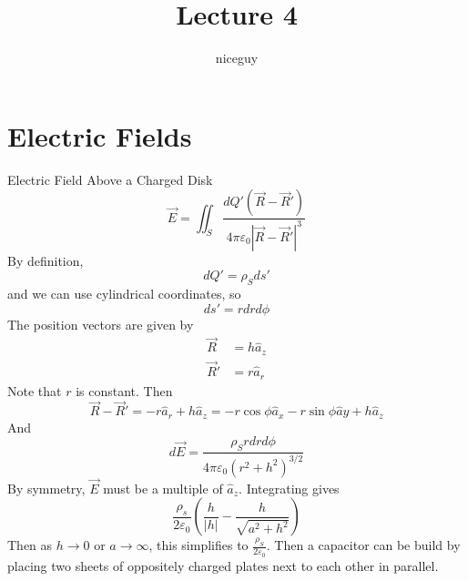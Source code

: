 \documentclass[12pt]{article}
\author{niceguy}
\title{Lecture 4}
\begin{document}
\maketitle

\section{Electric Fields}

\begin{ex}
	Electric Field Above a Charged Disk
	$$\vec{E} = \iint_S \frac{dQ'(\vec{R}-\vec{R}')}{4\pi\varepsilon_0|\vec{R}-\vec{R}'|^3}$$
	By definition,
	$$dQ' = \rho_Sds'$$
	and we can use cylindrical coordinates, so
	$$ds' = rdrd\phi$$
	The position vectors are given by
	\begin{align*}
		\vec{R} &= h\hat{a}_z \\
		\vec{R}' &= r\hat{a}_r
	\end{align*}
	Note that $r$ is constant. Then
	$$\vec{R}-\vec{R}' = -r\hat{a}_r + h\hat{a}_z = -r\cos\phi\hat{a}_x -r\sin\phi\hat{a}y + h\hat{a}_z$$
	And
	$$d\vec{E} = \frac{\rho_Srdrd\phi}{4\pi\varepsilon_0(r^2+h^2)^{3/2}}$$
	By symmetry, $\vec{E}$ must be a multiple of $\hat{a}_z$. Integrating gives
	$$\frac{\rho_s}{2\varepsilon_0}\left(\frac{h}{|h|}-\frac{h}{\sqrt{a^2+h^2}}\right)$$
	Then as $h\rightarrow0$ or $a\rightarrow\infty$, this simplifies to $\frac{\rho_S}{2\varepsilon_0}$. Then a capacitor can be build by placing two sheets of oppositely charged plates next to each other in parallel.
\end{ex}
	
\end{document}
